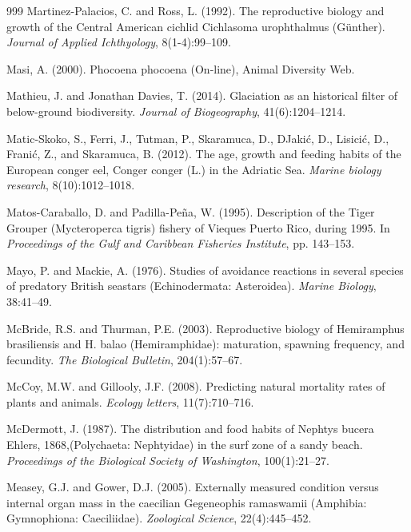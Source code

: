 \begin{thebibliography}{999}
Martinez-Palacios, C. and Ross, L. (1992). The reproductive biology and growth of the Central American cichlid Cichlasoma urophthalmus (G{\"u}nther). \textit{Journal of Applied Ichthyology}, 8(1-4):99--109.

Masi, A. (2000). Phocoena phocoena (On-line), {A}nimal {D}iversity {W}eb.

Mathieu, J. and Jonathan Davies, T. (2014). Glaciation as an historical filter of below-ground biodiversity. \textit{Journal of Biogeography}, 41(6):1204--1214.

Matic-Skoko, S., Ferri, J., Tutman, P., Skaramuca, D., DJaki{\'c}, D., Lisici{\'c}, D., Frani{\'c}, Z., and Skaramuca, B. (2012). The age, growth and feeding habits of the European conger eel, Conger conger (L.) in the Adriatic Sea. \textit{Marine biology research}, 8(10):1012--1018.

Matos-Caraballo, D. and Padilla-Pe{\~n}a, W. (1995). Description of the Tiger Grouper (Mycteroperca tigris) fishery of Vieques Puerto Rico, during 1995. In \textit{Proceedings of the Gulf and Caribbean Fisheries Institute}, pp. 143--153.

Mayo, P. and Mackie, A. (1976). Studies of avoidance reactions in several species of predatory British seastars (Echinodermata: Asteroidea). \textit{Marine Biology}, 38:41--49.

McBride, R.S. and Thurman, P.E. (2003). Reproductive biology of Hemiramphus brasiliensis and H. balao (Hemiramphidae): maturation, spawning frequency, and fecundity. \textit{The Biological Bulletin}, 204(1):57--67.

McCoy, M.W. and Gillooly, J.F. (2008). Predicting natural mortality rates of plants and animals. \textit{Ecology letters}, 11(7):710--716.

McDermott, J. (1987). The distribution and food habits of Nephtys bucera Ehlers, 1868,(Polychaeta: Nephtyidae) in the surf zone of a sandy beach. \textit{Proceedings of the Biological Society of Washington}, 100(1):21--27.

Measey, G.J. and Gower, D.J. (2005). Externally measured condition versus internal organ mass in the caecilian Gegeneophis ramaswamii (Amphibia: Gymnophiona: Caeciliidae). \textit{Zoological Science}, 22(4):445--452.


\end{thebibliography}
